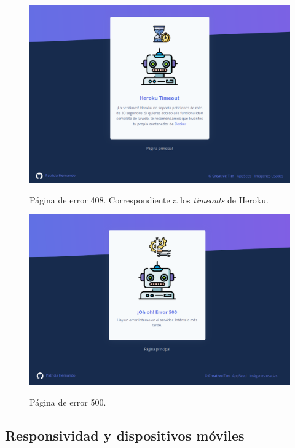 \begin{figure}[h]
	\caption[Manual de usuario: error 408]{Página de error 408. Correspondiente a los \textit{timeouts} de Heroku.}
	\centering
	\includegraphics[scale=0.27]{../img/anexos/user_guide/0_error_408}
	\label{e-0:error-408}
\end{figure}

\begin{figure}[h]
	\caption[Manual de usuario: error 500]{Página de error 500.}
	\centering
	\includegraphics[scale=0.27]{../img/anexos/user_guide/0_error_500}
	\label{e-0:error-500}
\end{figure}


\subsection{Responsividad y dispositivos móviles}

